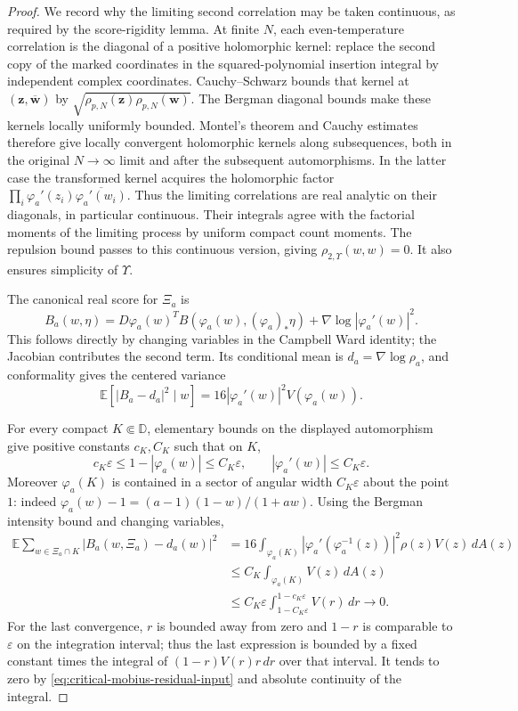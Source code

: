 \documentclass[11pt,a4paper]{article}
\numberwithin{equation}{section}
\theoremstyle{definition}
\theoremstyle{remark}
\begin{document}
\begin{proof}
We record why the limiting second correlation may be taken continuous,
as required by the score-rigidity lemma. At finite $N$, each even-temperature
correlation is the diagonal of a positive holomorphic kernel: replace
the second copy of the marked coordinates in the squared-polynomial
insertion integral by independent complex coordinates. Cauchy--Schwarz
bounds that kernel at $(\mathbf z,\overline{\mathbf w})$ by
$\sqrt{\rho_{p,N}(\mathbf z)\rho_{p,N}(\mathbf w)}$.
The Bergman diagonal bounds make these kernels locally uniformly bounded.
Montel's theorem and Cauchy estimates therefore give locally convergent
holomorphic kernels along subsequences, both in the original
$N\to\infty$ limit and after the subsequent automorphisms. In the latter
case the transformed kernel acquires the holomorphic factor
$\prod_i\varphi_a'(z_i)\overline{\varphi_a'(w_i)}$.
Thus the limiting correlations are real analytic on their diagonals,
in particular continuous. Their integrals agree with the factorial
moments of the limiting process by uniform compact count moments.
The repulsion bound passes to this continuous version, giving
$\rho_{2,\Upsilon}(w,w)=0$. It also ensures simplicity of $\Upsilon$.

The canonical real score for $\Xi_a$ is
\begin{equation}
 B_a(w,\eta)=D\varphi_a(w)^T
       B(\varphi_a(w),(\varphi_a)_*\eta)
       +\nabla\log|\varphi_a'(w)|^2.
 \label{eq:critical-mobius-score-transform}
\end{equation}
This follows directly by changing variables in the Campbell Ward
identity; the Jacobian contributes the second term. Its conditional mean
is $d_a=\nabla\log\rho_a$, and conformality gives the centered variance
\[
 \mathbb E[|B_a-d_a|^2\mid w]
       =16|\varphi_a'(w)|^2V(\varphi_a(w)).
\]

For every compact $K\Subset\mathbb D$, elementary bounds on the displayed
automorphism give positive constants $c_K,C_K$ such that on $K$,
\[
 c_K\varepsilon\leq1-|\varphi_a(w)|\leq C_K\varepsilon,
 \qquad |\varphi_a'(w)|\leq C_K\varepsilon.
\]
Moreover $\varphi_a(K)$ is contained in a sector of angular width
$C_K\varepsilon$ about the point $1$: indeed
$\varphi_a(w)-1=(a-1)(1-w)/(1+aw)$.
Using the Bergman intensity bound and changing variables,
\begin{align*}
 \mathbb E\sum_{w\in\Xi_a\cap K}|B_a(w,\Xi_a)-d_a(w)|^2
 &=16\int_{\varphi_a(K)}
   |\varphi_a'(\varphi_a^{-1}(z))|^2\rho(z)V(z)\,dA(z)\\
 &\leq C_K\int_{\varphi_a(K)}V(z)\,dA(z)\\
 &\leq C_K\varepsilon
          \int_{1-C_K\varepsilon}^{1-c_K\varepsilon}V(r)\,dr
 \longrightarrow0.
\end{align*}
For the last convergence, $r$ is bounded away from zero and
$1-r$ is comparable to $\varepsilon$ on the integration interval;
thus the last expression is bounded by a fixed constant times the
integral of $(1-r)V(r)r\,dr$ over that interval. It tends to zero by
\eqref{eq:critical-mobius-residual-input} and absolute continuity of
the integral.


\end{proof}
\end{document}
